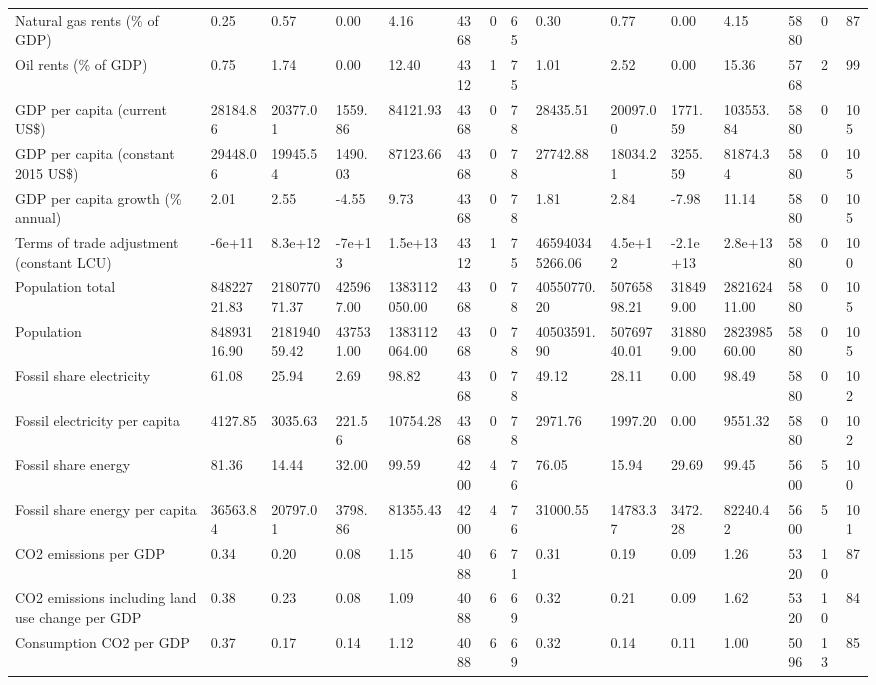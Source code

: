 \begin{longtable}{lllllllllllllll}
\addlinespace
Natural gas rents (\% of GDP) & 0.25 & 0.57 & 0.00 & 4.16 & 4368 & 0 & 65 & 0.30 & 0.77 & 0.00 & 4.15 & 5880 & 0 & 87\\
Oil rents (\% of GDP) & 0.75 & 1.74 & 0.00 & 12.40 & 4312 & 1 & 75 & 1.01 & 2.52 & 0.00 & 15.36 & 5768 & 2 & 99\\
GDP per capita (current US\$) & 28184.86 & 20377.01 & 1559.86 & 84121.93 & 4368 & 0 & 78 & 28435.51 & 20097.00 & 1771.59 & 103553.84 & 5880 & 0 & 105\\
GDP per capita (constant 2015 US\$) & 29448.06 & 19945.54 & 1490.03 & 87123.66 & 4368 & 0 & 78 & 27742.88 & 18034.21 & 3255.59 & 81874.34 & 5880 & 0 & 105\\
GDP per capita growth (\% annual) & 2.01 & 2.55 & -4.55 & 9.73 & 4368 & 0 & 78 & 1.81 & 2.84 & -7.98 & 11.14 & 5880 & 0 & 105\\
\addlinespace
Terms of trade adjustment (constant LCU) & -6e+11 & 8.3e+12 & -7e+13 & 1.5e+13 & 4312 & 1 & 75 & 465940345266.06 & 4.5e+12 & -2.1e+13 & 2.8e+13 & 5880 & 0 & 100\\
Population total & 84822721.83 & 218077071.37 & 425967.00 & 1383112050.00 & 4368 & 0 & 78 & 40550770.20 & 50765898.21 & 318499.00 & 282162411.00 & 5880 & 0 & 105\\
Population & 84893116.90 & 218194059.42 & 437531.00 & 1383112064.00 & 4368 & 0 & 78 & 40503591.90 & 50769740.01 & 318809.00 & 282398560.00 & 5880 & 0 & 105\\
Fossil share electricity & 61.08 & 25.94 & 2.69 & 98.82 & 4368 & 0 & 78 & 49.12 & 28.11 & 0.00 & 98.49 & 5880 & 0 & 102\\
Fossil electricity per capita & 4127.85 & 3035.63 & 221.56 & 10754.28 & 4368 & 0 & 78 & 2971.76 & 1997.20 & 0.00 & 9551.32 & 5880 & 0 & 102\\
\addlinespace
Fossil share energy & 81.36 & 14.44 & 32.00 & 99.59 & 4200 & 4 & 76 & 76.05 & 15.94 & 29.69 & 99.45 & 5600 & 5 & 100\\
Fossil share energy per capita & 36563.84 & 20797.01 & 3798.86 & 81355.43 & 4200 & 4 & 76 & 31000.55 & 14783.37 & 3472.28 & 82240.42 & 5600 & 5 & 101\\
CO2 emissions per GDP & 0.34 & 0.20 & 0.08 & 1.15 & 4088 & 6 & 71 & 0.31 & 0.19 & 0.09 & 1.26 & 5320 & 10 & 87\\
CO2 emissions including land use change per GDP & 0.38 & 0.23 & 0.08 & 1.09 & 4088 & 6 & 69 & 0.32 & 0.21 & 0.09 & 1.62 & 5320 & 10 & 84\\
Consumption CO2 per GDP & 0.37 & 0.17 & 0.14 & 1.12 & 4088 & 6 & 69 & 0.32 & 0.14 & 0.11 & 1.00 & 5096 & 13 & 85\\

\end{longtable}
